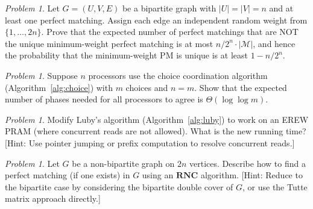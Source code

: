 \documentclass[twoside,12pt]{book}
\theoremstyle{plain}
\theoremstyle{definition}
\theoremstyle{remark}
\newtheorem{problem}[theorem]{Problem}
\begin{document}
\begin{problem}
\label{prob:isolating}
Let $G = (U, V, E)$ be a bipartite graph with $|U| = |V| = n$ and at least one perfect matching. Assign each edge an independent random weight from $\{1, \ldots, 2n\}$. Prove that the expected number of perfect matchings that are NOT the unique minimum-weight perfect matching is at most $n/2^n \cdot |\mathcal{M}|$, and hence the probability that the minimum-weight PM is unique is at least $1 - n/2^n$.
\end{problem}

\begin{problem}
\label{prob:choice-load}
Suppose $n$ processors use the choice coordination algorithm (Algorithm~\ref{alg:choice}) with $m$ choices and $n = m$. Show that the expected number of phases needed for all processors to agree is $\Theta(\log \log m)$.
\end{problem}

\begin{problem}
\label{prob:mis-erew}
Modify Luby's algorithm (Algorithm~\ref{alg:luby}) to work on an EREW PRAM (where concurrent reads are not allowed). What is the new running time? [Hint: Use pointer jumping or prefix computation to resolve concurrent reads.]
\end{problem}

\begin{problem}
\label{prob:perfect-matching-rnc}
Let $G$ be a non-bipartite graph on $2n$ vertices. Describe how to find a perfect matching (if one exists) in $G$ using an $\mathbf{RNC}$ algorithm. [Hint: Reduce to the bipartite case by considering the bipartite double cover of $G$, or use the Tutte matrix approach directly.]
\end{problem}
\end{document}
